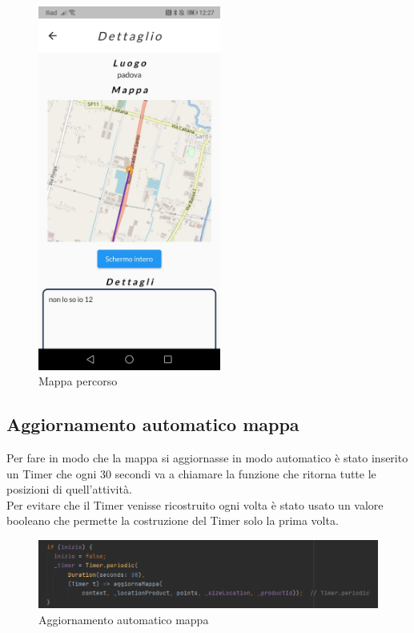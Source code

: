 \begin{figure}[htbp]	
	\centering
	\includegraphics[width=6cm]{immagini/mappa.jpeg}
	\caption{Mappa percorso}
	\label{fig:Mappa percorso}
\end{figure}

\newpage

\subsection{Aggiornamento automatico mappa}
Per fare in modo che la mappa si aggiornasse in modo automatico è stato inserito un Timer che ogni 30 secondi va a chiamare la funzione che ritorna tutte le posizioni di quell'attività.\\
Per evitare che il Timer venisse ricostruito ogni volta è stato usato un valore booleano che permette la costruzione del Timer solo la prima volta.\\

\begin{figure}[htbp]	
	\centering
	\includegraphics[width=14cm]{immagini/automatico.png}
	\caption{Aggiornamento automatico mappa}
	\label{fig:Aggiornamento automatico mappa}
\end{figure}

